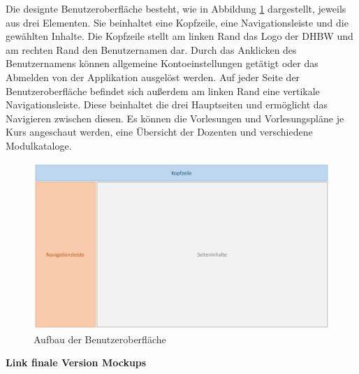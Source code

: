 Die designte Benutzeroberfläche besteht, wie in Abbildung \ref{fig:Seitenaufbau} dargestellt, jeweils aus drei Elementen.
Sie beinhaltet eine Kopfzeile, eine Navigationsleiste und die gewählten Inhalte.
Die Kopfzeile stellt am linken Rand das Logo der \acs{DHBW} und am rechten Rand den Benutzernamen dar.
Durch das Anklicken des Benutzernamens können allgemeine Kontoeinstellungen getätigt oder das Abmelden von der Applikation ausgelöst werden.
Auf jeder Seite der Benutzeroberfläche befindet sich außerdem am linken Rand eine vertikale Navigationsleiste.
Diese beinhaltet die drei Hauptseiten und ermöglicht das Navigieren zwischen diesen.
Es können die Vorlesungen und Vorlesungspläne je Kurs angeschaut werden, eine Übersicht der Dozenten und verschiedene Modulkataloge. 

\begin{figure}[h]
	\centering 
	\includegraphics[width=\textwidth]{img/Seitenaufbau1.pdf}
	\captionsetup{format=hang}
	\caption[Aufbau der Benutzeroberfläche]{\label{fig:Seitenaufbau}Aufbau der Benutzeroberfläche}
\end{figure}

\textbf{Link finale Version Mockups}


